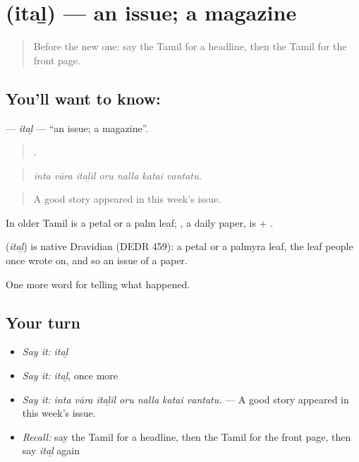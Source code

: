 \section[\texorpdfstring{\ta{இதழ்} (itaḻ)}{இதழ் (itaḻ)}]{ (itaḻ) — an issue; a magazine}

\label{lesson:TA-C306-ital}



\begin{quote}
Before the new one: say the Tamil for a headline, then the Tamil for the front page.
\end{quote}

\subsection*{You'll want to know: }
\textbf{} — \emph{itaḻ} — \textquotedblleft{}an issue; a magazine\textquotedblright{}.

\begin{quote}
      .
\end{quote}

\begin{quote}
\emph{inta vāra itaḻil oru nalla katai vantatu.}
\end{quote}

\begin{quote}
A good story appeared in this week's issue.
\end{quote}

In older Tamil  is a petal or a palm leaf; , a daily paper, is  + .

\begin{cousinweb}
\textbf{} (\emph{itaḻ}) is native Dravidian (DEDR 459): a petal or a palmyra leaf, the leaf people once wrote on, and so an issue of a paper.
\end{cousinweb}

\begin{grammarlens}[title={What you've built}]
One more word for telling what happened.
\end{grammarlens}

\subsection*{Your turn}
\begin{itemize}
\raggedright
  \item \emph{Say it:} \emph{itaḻ}
  \item \emph{Say it:} \emph{itaḻ}, once more
  \item \emph{Say it:} \emph{inta vāra itaḻil oru nalla katai vantatu.} — A good story appeared in this week's issue.
  \item \emph{Recall:} say the Tamil for a headline, then the Tamil for the front page, then say \emph{itaḻ} again
\end{itemize}

